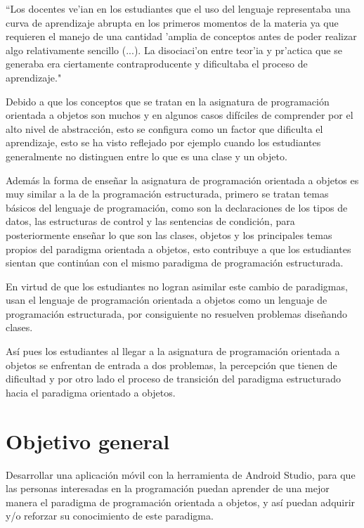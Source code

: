 \begin{minipage}{0.9\linewidth}
	 \vspace{5pt}
	 \begin{small}
	 	``Los docentes ve'ian en los estudiantes que el uso del lenguaje representaba una curva de aprendizaje abrupta en los primeros momentos de la materia ya que requieren el manejo de una cantidad 'amplia de conceptos antes de poder realizar algo relativamente sencillo (...). La disociaci'on entre teor'ia y pr'actica que se generaba era ciertamente contraproducente y dificultaba el proceso de aprendizaje."
	 \end{small}
\end{minipage}

Debido a que los conceptos que se tratan en la asignatura de programación orientada a objetos son muchos y en algunos casos difíciles de comprender por el alto nivel de abstracción, esto se configura como un factor que dificulta el aprendizaje, esto se ha visto reflejado por ejemplo cuando los estudiantes generalmente no distinguen entre lo que es una clase y un objeto.

Además la forma de enseñar la asignatura de programación orientada a objetos es muy similar a la de la programación estructurada, primero se tratan temas básicos del lenguaje de programación, como son la declaraciones de los tipos de datos, las estructuras de control y las sentencias de condición, para posteriormente enseñar lo que son las clases, objetos y los principales temas propios del paradigma orientada a objetos, esto contribuye a que los estudiantes sientan que continúan con el mismo paradigma de programación estructurada.

En virtud de que los estudiantes no logran asimilar este cambio de paradigmas, usan el lenguaje de programación orientada a objetos como un lenguaje de programación estructurada, por consiguiente no resuelven problemas diseñando clases.

Así pues los estudiantes al llegar a la asignatura de programación orientada a objetos se enfrentan de entrada a dos problemas, la percepción que tienen de dificultad y por otro lado el proceso de transición del paradigma estructurado hacia el paradigma orientado a objetos.

\section{Objetivo general}
Desarrollar una aplicación móvil con la herramienta de Android Studio, para que las personas interesadas en la programación puedan aprender de una mejor manera el paradigma de programación orientada a objetos, y así puedan adquirir y/o reforzar su conocimiento de este paradigma. 

